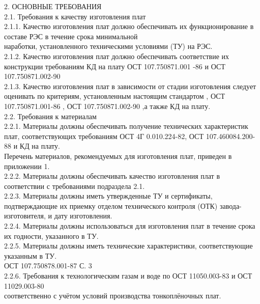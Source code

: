 \documentclass{bmstu}
\begin{document}
	2. ОСНОВНЫЕ ТРЕБОВАНИЯ  \\
	2.1. Требования к качеству изготовления плат \\
	2.1.1. Качество изготовления плат должно обеспечивать их функционирование в составе РЭС в течение срока минимальной \\
	наработки, установленного техническими условиями (ТУ) на РЭС. \\
	2.1.2. Качество изготовления плат должно обеспечивать соответствие их конструкции требованиям КД на плату  ОСТ 107.750871.001 -86  и ОСТ  107.750871.002-90 \\
	2.1.3. Качество изготовления плат в зависимости от стадии изготовления следует оценивать по критериям, установленным настоящим стандартом , ОСТ  107.750871.001-86 ,
	ОСТ 107.750871.002-90 ,а также КД на плату. \\
	2.2. Требования к материалам \\
	2.2.1. Материалы должны обеспечивать получение технических характеристик плат, соответствующих требованиям ОСТ 4Г 0.010.224-82, ОСТ 107.460084.200-88 и КД на плату. \\
	Перечень материалов, рекомендуемых для изготовления плат, приведен в приложении 1. \\
	2.2.2. Материалы должны обеспечивать качество изготовления плат в соответствии с требованиями подраздела 2.1. \\
	2.2.3. Материалы должны иметь утвержденные ТУ и сертификаты, подтверждающие их приемку отделом технического контроля (ОТК) завода-изготовителя, и дату изготовления. \\
	2.2.4. Материалы должны использоваться для изготовления плат в течение срока их годности, указанного в ТУ. \\
	2.2.5. Материалы должны иметь технические характеристики, соответствующие указанным в ТУ. \\
	
	ОСТ 107.750878.001-87 С. 3 \\
	
	2.2.6. Требования к технологическим газам и воде по  ОСТ 11050.003-83 и ОСТ 11029.003-80 \\
	соответственно с учётом условий производства тонкоплёночных плат. \\
	
\end{document}
